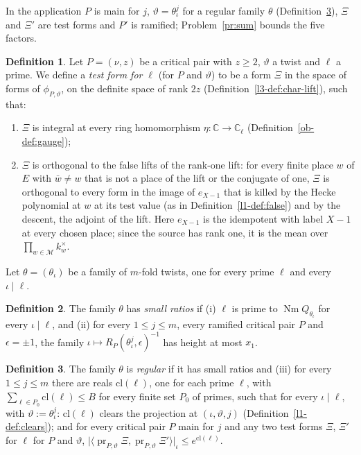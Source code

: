 \documentclass[reqno]{amsart}
\theoremstyle{definition}
\newtheorem{definition}{Definition}[section]
\theoremstyle{plain}
\theoremstyle{remark}
\newcommand{\C}{\mathbb{C}}
\newcommand{\Nm}{\operatorname{Nm}}
\newcommand{\pr}{\operatorname{pr}}
\newcommand{\cl}{\mathrm{cl}}
\begin{document}
In the application \(P\) is main for \(j\), \(\vartheta = \theta_\iota^j\) for a regular family \(\theta\) (Definition~\ref{def:regular}), \(\Xi\) and \(\Xi'\) are test forms and \(P'\) is ramified; Problem~\ref{pr:sum} bounds the five factors.

\begin{definition}\label{def:test}
Let \(P = (\nu, z)\) be a critical pair with \(z \ge 2\), \(\vartheta\) a twist and \(\ell\) a prime.  We define a \emph{test form for \(\ell\)} (for \(P\) and \(\vartheta\)) to be a form \(\Xi\) in the space of forms of \(\phi_{P,\vartheta}\), on the definite space of rank \(2z\) (Definition~\ref{l3-def:char-lift}), such that:
\begin{enumerate}
\item \(\Xi\) is integral at every ring homomorphism \(\eta\colon \C \to \C_\ell\) (Definition~\ref{ob-def:gauge});
\item \(\Xi\) is orthogonal to the false lifts of the rank-one lift: for every finite place \(w\) of \(E\) with \(\bar w \ne w\) that is not a place of the lift or the conjugate of one, \(\Xi\) is orthogonal to every form in the image of \(e_{X-1}\) that is killed by the Hecke polynomial at \(w\) at its test value (as in Definition~\ref{l1-def:false}) and by the descent, the adjoint of the lift.  Here \(e_{X-1}\) is the idempotent with label \(X - 1\) at every chosen place; since the source has rank one, it is the mean over \(\prod_{w \in \mathcal M} k_w^\times\).
\end{enumerate}
\end{definition}

Let \(\theta = (\theta_\iota)\) be a family of \(m\)-fold twists, one for every prime \(\ell\) and every \(\iota \mid \ell\).

\begin{definition}\label{def:small-ratios}
The family \(\theta\) has \emph{small ratios} if (i) \(\ell\) is prime to \(\Nm Q_{\theta_\iota}\) for every \(\iota \mid \ell\), and (ii) for every \(1 \le j \le m\), every ramified critical pair \(P\) and \(\epsilon = \pm 1\), the family \(\iota \mapsto R_P(\theta_\iota^j, \epsilon)^{-1}\) has height at most \(x_1\).
\end{definition}

\begin{definition}\label{def:regular}
The family \(\theta\) is \emph{regular} if it has small ratios and (iii) for every \(1 \le j \le m\) there are reals \(\cl(\ell)\), one for each prime \(\ell\), with \(\sum_{\ell \in P_0} \cl(\ell) \le B\) for every finite set \(P_0\) of primes, such that for every \(\iota \mid \ell\), with \(\vartheta := \theta_\iota^j\): \(\cl(\ell)\) clears the projection at \((\iota, \vartheta, j)\) (Definition~\ref{l1-def:clears}); and for every critical pair \(P\) main for \(j\) and any two test forms \(\Xi\), \(\Xi'\) for \(\ell\) for \(P\) and \(\vartheta\), \(\lvert\langle\pr_{P,\vartheta}\Xi, \pr_{P,\vartheta}\Xi'\rangle\rvert_\iota \le e^{\cl(\ell)}\).
\end{definition}
\end{document}
